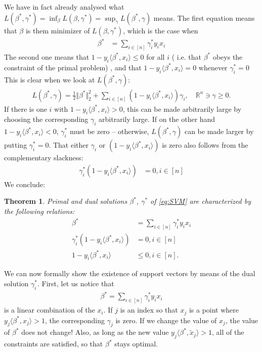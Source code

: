 \documentclass{article}
\newcommand{\sprod}[1]{\langle #1 \rangle}
\newcommand{\R}{\mathbb{R}}
\newtheorem{theorem}{Theorem}
\newcommand{\norm}[1]{\Vert #1 \Vert}
\begin{document}
We have in fact already analysed what $L(\beta^*,\gamma^*) = \inf_{\beta} L(\beta,\gamma^*) = \sup_\gamma L(\beta^*,\gamma)$ means. The first equation means that $\beta$ is them minimizer of $L(\beta,\gamma^*)$, which is the case when
\begin{align*}
     \beta^* &= \sum_{i \in [n]} \gamma_i^* y_i x_i
\end{align*}
The second one means that $1-y_i \sprod{\beta^*,x_i} \leq 0$ for all $i$ ( i.e. that $\beta^*$ obeys the constraint of the primal problem) , and that $1-y_i \sprod{\beta^*,x_i} = 0$ whenever $\gamma_i^*=0$  This is clear when we look at $L(\beta^*,\gamma)$:
\begin{align*}
    L(\beta^*, \gamma) = \tfrac{1}{2}\norm{\beta^*}_2^2 + \sum_{i\in [n]}(1-y_i\sprod{\beta^*,x_i})\gamma_i, \quad  \R^n \ni \gamma \geq 0.
\end{align*}
If there is one $i$ with $1-y_i \sprod{\beta^*,x_i} >0$, this can be made arbitrarily large by choosing the corresponding $\gamma_i$ arbitrarily large. If on the other hand $1-y_i \sprod{\beta^*,x_i} <0$, $\gamma_i^*$ must be zero -- otherwise, $L(\beta^*,\gamma)$ can be made larger by putting $\gamma_i^*=0$. That either $\gamma_i$ or $(1-y_i\sprod{\beta^*,x_i})$ is zero also follows from the complementary slackness: 
\begin{align*}
    \gamma_i^* (1-y_i\sprod{\beta^*,x_i})&=0 , i \in [n]
\end{align*}
We conclude:
\begin{theorem}
    Primal and dual solutions $\beta^*$, $\gamma^*$ of \eqref{eq:SVM} are characterized by the following relations:
    \begin{align*}
        \beta^* &= \sum_{i \in [n]} \gamma_i^* y_i x_i \\
        \gamma_i^* (1-y_i\sprod{\beta^*,x_i})&=0 , i \in [n] \\
        1-y_i \sprod{\beta^*,x_i} &\leq 0, i \in [n].
    \end{align*}
    
\end{theorem}
We can now formally show the existence of support vectors by means of the dual solution $\gamma_i^*$. First, let us notice that 
\begin{align*}
    \beta^* = \sum_{i \in [n]}\gamma_i^*y_ix_i
\end{align*}
is a linear combination of the $x_i$. If $j$ is an index so that $x_j$ is a point where $y_j\sprod{\beta^*,x_j}>1$, the corresponding $\gamma_j$ is zero. If we change the value of $x_j$, the value of $\beta^*$ does not change! Also, as long as the new value $y_j\sprod{\beta^*,\tilde{x}_j}>1$, all of the constraints are satisfied, so that $\beta^*$ stays optimal.
\end{document}
